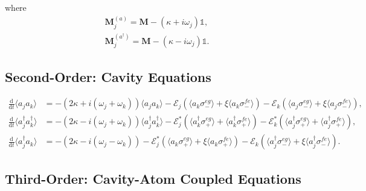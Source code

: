 \documentclass{article}
\newcommand{\ddt}[1][]{\frac{\mathrm{d} #1}{\mathrm{d}t}}
\begin{document}
where
\begin{subequations}
	\begin{gather}
		\bm{M}_{j}^{(a)} = \bm{M} - \left( \kappa + i \omega_{j} \right) \mathbb{1}, \\
		\bm{M}_{j}^{(a^{\dagger})} = \bm{M} - \left( \kappa - i \omega_{j} \right) \mathbb{1}.
	\end{gather}
\end{subequations}

\subsection{Second-Order: Cavity Equations}

\begin{subequations}
\begin{align}
	\ddt \langle a_{j} a_{k} \rangle &= -\left(2 \kappa + i \left( \omega_{j} + \omega_{k} \right) \right) \langle a_{j} a_{k} \rangle - \mathcal{E}_{j} \left( \langle a_{k} \sigma^{eg}_{-} \rangle + \xi \langle a_{k} \sigma^{fe}_{-} \rangle \right) - \mathcal{E}_{k} \left( \langle a_{j} \sigma^{eg}_{-} \rangle + \xi \langle a_{j} \sigma^{fe}_{-} \rangle \right), \\
	\ddt \langle a^{\dagger}_{j} a^{\dagger}_{k} \rangle &= -\left(2 \kappa - i \left( \omega_{j} + \omega_{k} \right) \right) \langle a^{\dagger}_{j} a^{\dagger}_{k} \rangle - \mathcal{E}_{j}^{*} \left( \langle a^{\dagger}_{k} \sigma^{eg}_{+} \rangle + \langle a^{\dagger}_{k} \sigma^{fe}_{+} \rangle \right) - \mathcal{E}_{k}^{*} \left( \langle a^{\dagger}_{j} \sigma^{eg}_{+} \rangle + \langle a^{\dagger}_{j} \sigma^{fe}_{+} \rangle \right), \\
	\ddt \langle a^{\dagger}_{j} a_{k} \rangle &= -\left( 2\kappa - i \left( \omega_{j} - \omega_{k} \right) \right) - \mathcal{E}_{j}^{*} \left( \langle a_{k} \sigma^{eg}_{+} \rangle + \xi \langle a_{k} \sigma^{fe}_{+} \rangle \right)- \mathcal{E}_{k} \left( \langle a_{j}^{\dagger} \sigma^{eg}_{-} \rangle + \xi \langle a_{j}^{\dagger} \sigma^{fe}_{-} \rangle \right).
\end{align}
\end{subequations}

\subsection{Third-Order: Cavity-Atom Coupled Equations}
\end{document}
